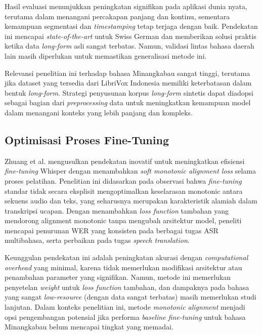 Hasil evaluasi menunjukkan peningkatan signifikan pada aplikasi dunia nyata, terutama dalam menangani percakapan panjang dan kontinu, sementara kemampuan segmentasi dan \textit{timestamping} tetap terjaga dengan baik. Pendekatan ini mencapai \textit{state-of-the-art} untuk Swiss German dan memberikan solusi praktis ketika data \textit{long-form} asli sangat terbatas. Namun, validasi lintas bahasa daerah lain masih diperlukan untuk memastikan generalisasi metode ini.

Relevansi penelitian ini terhadap bahasa Minangkabau sangat tinggi, terutama jika dataset yang tersedia dari LibriVox Indonesia memiliki keterbatasan dalam bentuk \textit{long-form}. Strategi penyusunan korpus \textit{long-form} sintetis dapat diadopsi sebagai bagian dari \textit{preprocessing} data untuk meningkatkan kemampuan model dalam menangani konteks yang lebih panjang dan kompleks.

\subsection{Optimisasi Proses Fine-Tuning}

Zhuang et al. \cite{zhuang2025monotonic} mengusulkan pendekatan inovatif untuk meningkatkan efisiensi \textit{fine-tuning} Whisper dengan menambahkan \textit{soft monotonic alignment loss} selama proses pelatihan. Penelitian ini didasarkan pada observasi bahwa \textit{fine-tuning} standar tidak secara eksplisit mengoptimalkan keselarasan monotonic antara sekuens audio dan teks, yang seharusnya merupakan karakteristik alamiah dalam transkripsi ucapan. Dengan menambahkan \textit{loss function} tambahan yang mendorong alignment monotonic tanpa mengubah arsitektur model, peneliti mencapai penurunan WER yang konsisten pada berbagai tugas ASR multibahasa, serta perbaikan pada tugas \textit{speech translation}.

Keunggulan pendekatan ini adalah peningkatan akurasi dengan \textit{computational overhead} yang minimal, karena tidak memerlukan modifikasi arsitektur atau penambahan parameter yang signifikan. Namun, metode ini memerlukan penyetelan \textit{weight} untuk \textit{loss function} tambahan, dan dampaknya pada bahasa yang sangat \textit{low-resource} (dengan data sangat terbatas) masih memerlukan studi lanjutan. Dalam konteks penelitian ini, metode \textit{monotonic alignment} menjadi opsi pengembangan potensial jika performa \textit{baseline fine-tuning} untuk bahasa Minangkabau belum mencapai tingkat yang memadai.

